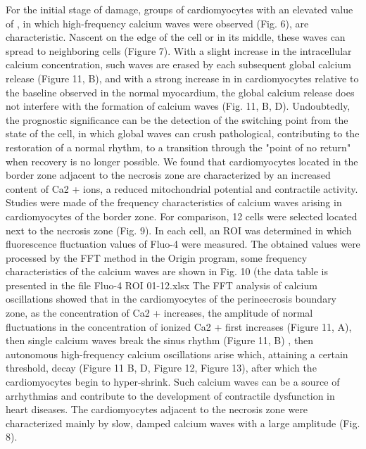 \documentclass{biophys-new}
\begin{document}

For the initial stage of damage, groups of cardiomyocytes with an elevated value of , in which high-frequency calcium waves were observed (Fig. 6), are characteristic. Nascent on the edge of the cell or in its middle, these waves can spread to neighboring cells (Figure 7). With a slight increase in the intracellular calcium concentration, such waves are erased by each subsequent global calcium release (Figure 11, B), and with a strong increase in  in cardiomyocytes relative to the baseline observed in the normal myocardium, the global calcium release does not interfere with the formation of calcium waves (Fig. 11, B, D). Undoubtedly, the prognostic significance can be the detection of the switching point from the state of the cell, in which global waves can crush pathological, contributing to the restoration of a normal rhythm, to a transition through the "point of no return" when recovery is no longer possible.
We found that cardiomyocytes located in the border zone adjacent to the necrosis zone are characterized by an increased content of Ca2 + ions, a reduced mitochondrial potential and contractile activity. Studies were made of the frequency characteristics of calcium waves arising in cardiomyocytes of the border zone. For comparison, 12 cells were selected located next to the necrosis zone (Fig. 9). In each cell, an ROI was determined in which fluorescence fluctuation values of Fluo-4 were measured. The obtained values were processed by the FFT method in the Origin program, some frequency characteristics of the calcium waves are shown in Fig. 10 (the data table is presented in the file Fluo-4 ROI 01-12.xlsx
The FFT analysis of calcium oscillations showed that in the cardiomyocytes of the perineecrosis boundary zone, as the concentration of Ca2 + increases, the amplitude of normal fluctuations in the concentration of ionized Ca2 + first increases (Figure 11, A), then single calcium waves break the sinus rhythm (Figure 11, B) ,
then autonomous high-frequency calcium oscillations arise which, attaining a certain threshold, decay (Figure 11 B, D, Figure 12, Figure 13), after which the cardiomyocytes begin to hyper-shrink. Such calcium waves can be a source of arrhythmias and contribute to the development of contractile dysfunction in heart diseases.
The cardiomyocytes adjacent to the necrosis zone were characterized mainly by slow, damped calcium waves with a large amplitude (Fig. 8).
\end{document}
